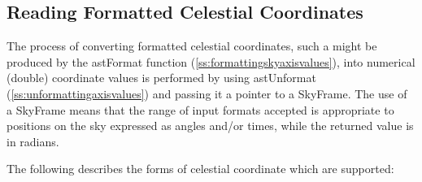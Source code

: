 \documentclass[twoside,11pt]{article}
\newcommand{\htmlref}[2]{#1}
\newcommand{\secref}[1]{\S\ref{#1}}
\renewcommand{\secref}[1]{\ref{#1}}
\begin{document}
\subsection{\label{ss:unformattingskyaxisvalues}Reading Formatted Celestial Coordinates}

The process of converting formatted celestial coordinates, such a
might be produced by the \htmlref{astFormat}{astFormat} function
(\secref{ss:formattingskyaxisvalues}), into numerical (double)
coordinate values is performed by using \htmlref{astUnformat}{astUnformat}
(\secref{ss:unformattingaxisvalues}) and passing it a pointer to a
\htmlref{SkyFrame}{SkyFrame}. The use of a SkyFrame means that the range of input formats
accepted is appropriate to positions on the sky expressed as angles
and/or times, while the returned value is in radians.

The following describes the forms of celestial coordinate which are
supported:
\end{document}
